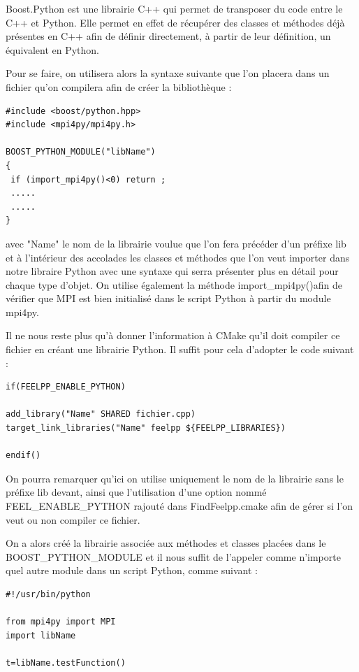 \documentclass[french,12pt]{article}
\begin{document}
Boost.Python est une librairie C++ qui permet de transposer du code entre le C++ et Python. Elle permet en effet de récupérer des classes et méthodes déjà présentes en C++ afin de définir directement, à partir de leur définition, un équivalent en Python. 
\newline

Pour se faire, on utilisera alors la syntaxe suivante que l'on placera dans un fichier qu'on compilera afin de créer la bibliothèque :

\begin{lstlisting}
#include <boost/python.hpp>
#include <mpi4py/mpi4py.h>

BOOST_PYTHON_MODULE("libName")
{
 if (import_mpi4py()<0) return ;
 .....
 .....
}
\end{lstlisting}

avec "Name" le nom de la librairie voulue que l'on fera précéder d'un préfixe lib et à l'intérieur des accolades les classes et méthodes que l'on veut importer dans notre libraire Python avec une syntaxe qui serra présenter plus en détail pour chaque type d'objet. On utilise également la méthode import\_mpi4py()afin de vérifier que MPI est bien initialisé dans le script Python à partir du module mpi4py.
\newline

Il ne nous reste plus qu'à donner l'information à CMake qu'il doit compiler ce fichier en créant une librairie Python. Il suffit pour cela d'adopter le code suivant : 
\begin{lstlisting}
if(FEELPP_ENABLE_PYTHON)

add_library("Name" SHARED fichier.cpp)
target_link_libraries("Name" feelpp ${FEELPP_LIBRARIES})

endif()
\end{lstlisting}

On pourra remarquer qu'ici on utilise uniquement le nom de la librairie sans le préfixe lib devant, ainsi que l'utilisation d'une option nommé FEEL\_ENABLE\_PYTHON rajouté dans FindFeelpp.cmake afin de gérer si l'on veut ou non compiler ce fichier. 
\newline

On a alors créé la librairie associée aux méthodes et classes placées dans le BOOST\_PYTHON\_MODULE et il nous suffit de l'appeler comme n'importe quel autre module dans un script Python, comme suivant :
\begin{lstlisting}
#!/usr/bin/python

from mpi4py import MPI
import libName

t=libName.testFunction()
\end{lstlisting}
\end{document}
